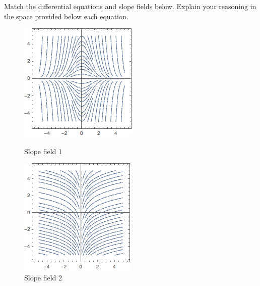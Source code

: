 \documentclass[11pt]{exam}
\begin{document}
%
%
%

\begin{questions}



\addpoints
\question Match the differential equations and slope fields below. Explain your reasoning in the space provided below each equation.   

\begin{figure}[h]
\centering
\begin{minipage}{.5\textwidth}
  \centering
  \includegraphics[width=.4\linewidth]{slopefield3}
  \caption{Slope field 1}
\end{minipage}%
\begin{minipage}{.5\textwidth}
  \centering
  \includegraphics[width=.4\linewidth]{slopefield2}
  \caption{Slope field 2}
\end{minipage}
\end{figure}

\begin{parts}

\end{parts}
\end{questions}
\end{document}
